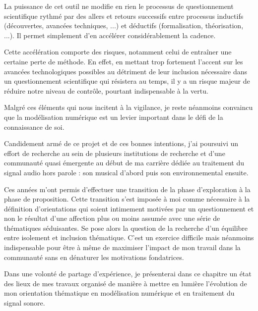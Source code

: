 La puissance de cet outil ne modifie en rien le processus de questionnement scientifique rythmé par des allers et retours successifs entre processus inductifs (découvertes, avancées techniques, ...) et déductifs (formalisation, théorisation, ...). Il permet simplement d'en accélérer considérablement la cadence.

Cette accélération comporte des risques, notamment celui de entraîner une certaine perte de méthode. En effet, en mettant trop fortement l'accent sur les avancées technologiques possibles au détriment de leur inclusion nécessaire dans un questionnement scientifique qui résistera au temps, il y a un risque majeur de réduire notre niveau de contrôle, pourtant indispensable à la vertu.


Malgré ces éléments qui nous incitent à la vigilance, je reste néanmoins convaincu que la modélisation numérique est un levier important dans le défi de la connaissance de soi.

Candidement armé de ce projet et de ces bonnes intentions, j'ai poursuivi un effort de recherche au sein de plusieurs institutions de recherche et d'une communauté quasi émergente au début de ma carrière dédiée au traitement du signal audio \og hors parole \fg : son musical d'abord puis son environnemental ensuite. %

Ces années m'ont permis d'effectuer une transition de la phase d'exploration à la phase de proposition. Cette transition s'est imposée à moi comme nécessaire à la définition d'orientations qui soient intimement motivées par un questionnement et non le résultat d'une affection plus ou moins assumée avec une série de thématiques séduisantes. Se pose alors la question de la recherche d'un équilibre entre isolement et inclusion thématique. C'est un exercice difficile mais néanmoins indispensable pour être à même de maximiser l'impact de mon travail dans la communauté sans en dénaturer les motivations fondatrices.

Dans une volonté de partage d'expérience, je présenterai dans ce chapitre un état des lieux de mes travaux organisé de manière à mettre en lumière l'évolution de mon orientation thématique en modélisation numérique et en traitement du signal sonore.

